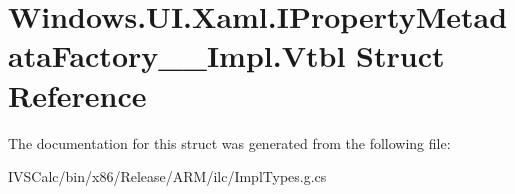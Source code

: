 \hypertarget{struct_windows_1_1_u_i_1_1_xaml_1_1_i_property_metadata_factory_____impl_1_1_vtbl}{}\section{Windows.\+U\+I.\+Xaml.\+I\+Property\+Metadata\+Factory\+\_\+\+\_\+\+Impl.\+Vtbl Struct Reference}
\label{struct_windows_1_1_u_i_1_1_xaml_1_1_i_property_metadata_factory_____impl_1_1_vtbl}


The documentation for this struct was generated from the following file\+:\begin{DoxyCompactItemize}
\item 
I\+V\+S\+Calc/bin/x86/\+Release/\+A\+R\+M/ilc/Impl\+Types.\+g.\+cs\end{DoxyCompactItemize}
